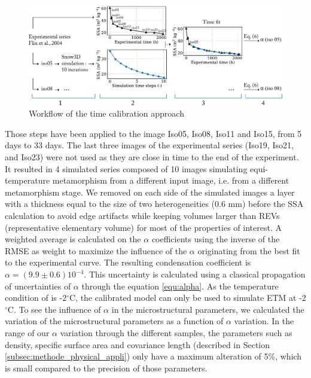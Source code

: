 \documentclass[draft,ms]{agujournal2019}
\begin{document}
\hspace*{-0.2cm}
\begin{figure}
    \centering
    \includegraphics[width = \linewidth]{Figures/workflow_aff.pdf}
    \caption{Workflow of the time calibration approach}
    \label{fig:workflow}
\end{figure}
Those steps have been applied to the image Iso05, Iso08, Iso11 and Iso15, from 5 days to 33 days. The last three images of the experimental series (Iso19, Iso21, and Iso23) were not used as they are close in time to the end of the experiment. It resulted in 4 simulated series composed of 10 images simulating equi-temperature metamorphism from a different input image, i.e. from a different metamorphism stage. We removed on each side of the simulated images a layer with a thickness equal to the size of two heterogeneities (0.6 mm) before the SSA calculation to avoid edge artifacts while keeping volumes larger than REVs (representative elementary volume) for most of the properties of interest. A weighted average is calculated on the $\alpha$ coefficients using the inverse of the RMSE as weight to maximize the influence of the $\alpha$ originating from the best fit to the experimental curve. The resulting condensation coefficient is $\alpha = ( 9.9 \pm 0.6) 10^{-4}$. This uncertainty is calculated using a classical propagation of uncertainties of $\alpha$ through the equation \eqref{equ:alpha}. As the temperature condition of  is -2$^\circ$C, the calibrated model can only be used to simulate ETM at -2$^\circ$C. To see the influence of $\alpha$ in the microstructural parameters, we calculated the variation of the microstructural parameters as a function of $\alpha$ variation. In the range of our $\alpha$ variation through the different samples, the parameters such as density, specific surface area and covariance length (described in Section \ref{subsec:methode_physical_appli}) only have a maximum alteration of 5\%, which is small compared to the precision of those parameters. 
\end{document}
